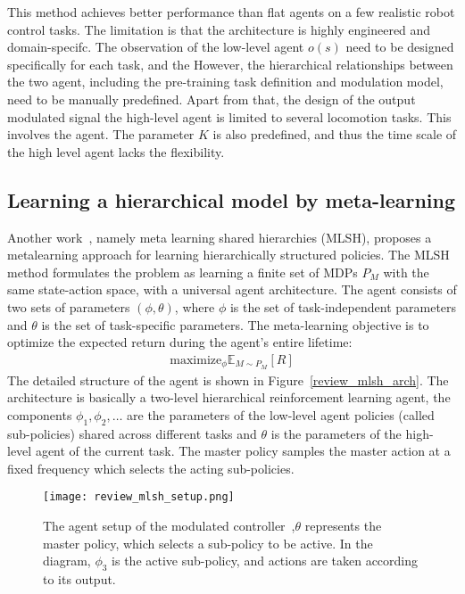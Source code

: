 This method achieves better performance than flat agents on a few realistic robot control tasks. The limitation is that the architecture is highly engineered and domain-specifc. The observation of the low-level agent $o(s)$ need to be designed specifically for each task, and the However, the hierarchical relationships between the two agent, including the pre-training task definition and modulation model, need to be manually predefined. Apart from that, the design of the output modulated signal the high-level agent is limited to several locomotion tasks. This involves the agent. The parameter $K$ is also predefined, and thus the time scale of the high level agent lacks the flexibility.

\subsection{Learning a hierarchical model by meta-learning}
Another work~\cite{frans2017meta}, namely meta learning shared hierarchies (MLSH), proposes a metalearning approach for learning hierarchically structured policies.
The MLSH method formulates the problem as learning a finite set of MDPs $P_M$ with the same state-action space, with a universal agent architecture. The agent consists of two sets of parameters $(\phi,\theta)$, where $\phi$ is the set of task-independent parameters and $\theta$ is the set of task-specific parameters. The meta-learning objective is to optimize the expected return during the agent's entire lifetime:
\begin{align}
\mathrm{maximize}_\phi \mathbb{E}_{M\sim P_M}[R]
\end{align}
The detailed structure of the agent is shown in Figure~\ref{review_mlsh_arch}. The architecture is basically a two-level hierarchical reinforcement learning agent, the components $\phi_1,\phi_2,\dots$ are the parameters of the low-level agent policies (called sub-policies) shared across different tasks and $\theta$ is the parameters of the high-level agent of the current task. The master policy samples the master action at a fixed frequency which selects the acting sub-policies.
\begin{figure}[h]
	\texttt{[image: review\_mlsh\_setup.png]}
	\centering
	\caption{The agent setup of the modulated controller~\cite{frans2017meta},$\theta$ represents the master policy, which selects
		a sub-policy to be active. In the diagram, $\phi_3$ is the active sub-policy, and actions are taken according
		to its output.}
\end{figure}\label{review_mlsh_arch}
